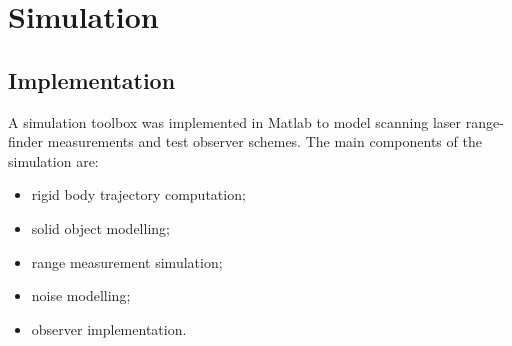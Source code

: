 \chapter{Simulation} \label{chap:simulation}
\section{Implementation}
A simulation toolbox was implemented in Matlab to model scanning laser range-finder measurements and test observer schemes. The main components of the simulation are:
\begin{itemize} \setlength\itemsep{-2mm}
\item rigid body trajectory computation;
\item solid object modelling;
\item range measurement simulation;
\item noise modelling;
\item observer implementation.
\end{itemize}

